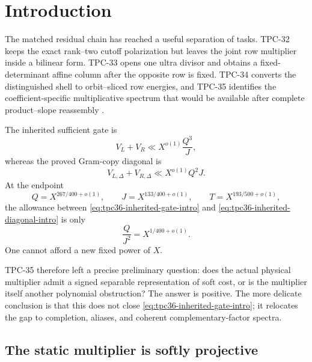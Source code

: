 \section{Introduction}
\label{sec:tpc36-introduction}

The matched residual chain has reached a useful separation of tasks.
TPC-32 keeps the exact rank--two cutoff polarization but leaves the joint
row multiplier inside a bilinear form.  TPC-33 opens one ultra divisor and
obtains a fixed-determinant affine column after the opposite row is fixed.
TPC-34 converts the distinguished shell to orbit--sliced row energies, and
TPC-35 identifies the coefficient-specific multiplicative spectrum that
would be available after complete product--slope reassembly
\citep{WangTPC32,WangTPC33,WangTPC34,WangTPC35}.

The inherited sufficient gate is
\begin{equation}
 V_L+V_R\ll X^{o(1)}\frac{Q^3}{J},
 \label{eq:tpc36-inherited-gate-intro}
\end{equation}
whereas the proved Gram-copy diagonal is
\begin{equation}
 V_{L,\Delta}+V_{R,\Delta}
 \ll X^{o(1)}Q^2J.
 \label{eq:tpc36-inherited-diagonal-intro}
\end{equation}
At the endpoint
\begin{equation}
 Q=X^{267/400+o(1)},\qquad
 J=X^{133/400+o(1)},\qquad
 T=X^{193/500+o(1)},
 \label{eq:tpc36-endpoint-intro}
\end{equation}
the allowance between \eqref{eq:tpc36-inherited-gate-intro} and
\eqref{eq:tpc36-inherited-diagonal-intro} is only
\begin{equation}
 \frac{Q}{J^2}=X^{1/400+o(1)}.
 \label{eq:tpc36-margin-intro}
\end{equation}
One cannot afford a new fixed power of \(X\).

TPC-35 therefore left a precise preliminary question: does the actual
physical multiplier admit a signed separable representation of soft cost,
or is the multiplier itself another polynomial obstruction?  The answer
is positive.  The more delicate conclusion is that this does not close
\eqref{eq:tpc36-inherited-gate-intro}; it relocates the gap to completion,
aliases, and coherent complementary-factor spectra.

\subsection{The static multiplier is softly projective}

